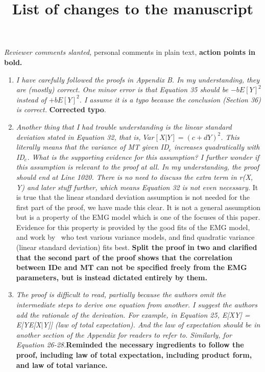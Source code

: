 \documentclass{article}
\title{List of changes to the manuscript}
\author{}
\date{}
\begin{document}
\maketitle

\textit{Reviewer comments slanted,} personal comments in plain text, \textbf{action points in bold.}

\begin{enumerate}
    \item \textit{I have carefully followed the proofs in Appendix B. In my understanding, they are
    (mostly) correct. One minor error is that Equation 35 should be
    $-bE[Y]^2$ instead of $+bE[Y]^2$. I assume it is a typo because the
    conclusion (Section 36) is correct.}
    \textbf{Corrected typo}.
    \item \textit{Another thing that I had trouble understanding is the linear standard deviation stated in Equation 32, that is, $Var[X\vert Y] = (c + dY)^2$. This literally means that the variance of MT given ID$_e$ increases quadratically with ID$_e$. What is the supporting evidence for this assumption? I further
    wonder if this assumption is relevant to the proof at all. In my understanding, the proof should end at Line 1020. There is no need to discuss the extra term in r(X, Y) and later stuff further, which means Equation 32 is not even necessary.} It is true that the linear standard deviation assumption is not needed for the first part of the proof, we have made this clear. It is not a general assumption but is a property of the EMG model which is one of the focuses of this paper. Evidence for this property is provided by the good fits of the EMG model, and work by~\cite{zhao2022} who test various variance models, and find quadratic variance (\ie linear standard deviation) fits best. \textbf{Split the proof in two and clarified that the second part of the proof shows that the correlation between IDe and MT can not be specified freely from the EMG parameters, but is instead dictated entirely by them.}
    \item \textit{The proof is difficult to read, partially because the authors omit the intermediate steps to derive one equation from another. I suggest the authors add the rationale of the derivation. For example, in Equation 25, E[XY] = E[YE[X$\vert$Y]] (law of total expectation). And the law of expectation should be in another section of the Appendix for readers to refer to. Similarly, for Equation 26-28.}\textbf{Reminded the necessary ingredients to follow the proof, including law of total expectation, including product form, and law of total variance.}

\end{enumerate}
\end{document}
